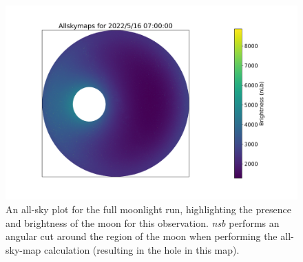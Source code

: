 \begin{figure}[ht]
\begin{centering}
\includegraphics[width=1\columnwidth]{./figures/allskyetacarextreme.png}
\caption{An all-sky plot for the full moonlight run, highlighting the presence and brightness of the moon for this observation. \textit{nsb} performs an angular cut around the region of the moon when performing the all-sky-map calculation (resulting in the hole in this map).}
\label{fig:allskyetacarextreme}
\end{centering}
\end{figure}

